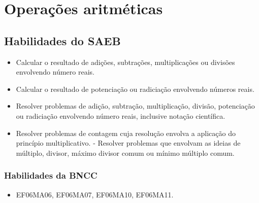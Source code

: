 
\chapter{Operações aritméticas}

\section*{Habilidades do SAEB}

\begin{itemize}
\item Calcular o resultado de adições, subtrações,
multiplicações ou divisões envolvendo número reais. 
\item Calcular o
resultado de potenciação ou radiciação envolvendo números reais.
\item Resolver problemas de adição, subtração, multiplicação, divisão,
  potenciação ou radiciação envolvendo número reais, inclusive notação
  científica.
\item Resolver problemas de contagem cuja resolução envolva a aplicação do
  princípio multiplicativo. - Resolver problemas que envolvam as ideias
  de múltiplo, divisor, máximo divisor comum ou mínimo múltiplo comum.
\end{itemize}

\subsection{Habilidades da BNCC}
\begin{itemize} 
\item  EF06MA06, EF06MA07, EF06MA10, EF06MA11.
\end{itemize}



